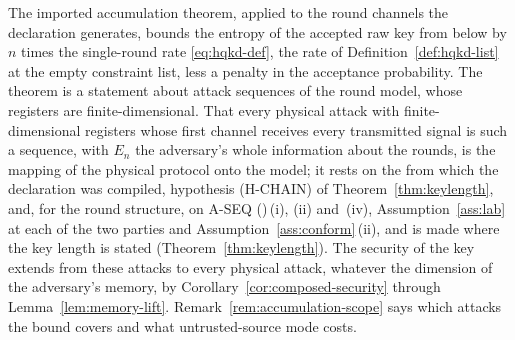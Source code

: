 
The imported accumulation theorem, applied to the round channels the
declaration generates, bounds the entropy of the accepted raw key from below
by $n$ times the single-round rate \eqref{eq:hqkd-def}, the rate of
Definition~\ref{def:hqkd-list} at the empty constraint list, less a penalty in
the acceptance probability. The theorem is a statement about attack
sequences of the round model, whose registers are finite-dimensional. That
every physical attack with finite-dimensional registers whose first channel
receives every transmitted signal is such a sequence, with $E_n$ the
adversary's whole information about the rounds, is the mapping of the
physical protocol onto the model; it rests on the  from which
the declaration was compiled, hypothesis (H-CHAIN) of
Theorem~\ref{thm:keylength}, and, for the round structure, on A-SEQ
()\,(i), (ii) and~(iv), Assumption~\ref{ass:lab}
at each of the two parties and Assumption~\ref{ass:conform}\,(ii), and is made
where the key length is stated (Theorem~\ref{thm:keylength}). The security
of the key extends from these attacks to every physical attack, whatever the
dimension of the adversary's memory, by Corollary~\ref{cor:composed-security}
through Lemma~\ref{lem:memory-lift}.
Remark~\ref{rem:accumulation-scope} says which attacks the bound covers and
what untrusted-source mode costs.

